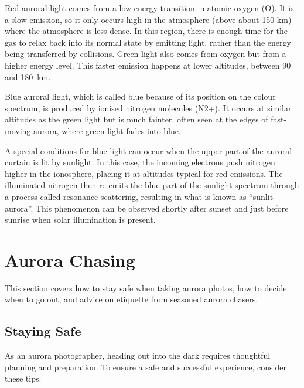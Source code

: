 \documentclass{article}
\newcommand{\contributed}[1]{%
    \par\noindent
    \begingroup
    \setlength{\leftskip}{1em}%
    \itshape
    Contributors: #1
    \par
    \endgroup
    \vspace{0.5em}
}
\begin{document}
Red auroral light comes from a low-energy transition in atomic oxygen (O). It is a slow emission, so it only occurs high in the atmosphere (above about 150 km) where the atmosphere is less dense. In this region, there is enough time for the gas to relax back into its normal state by emitting light, rather than the energy being transferred by collisions. Green light also comes from oxygen but from a higher energy level. This faster emission happens at lower altitudes, between 90 and 180~km.


Blue auroral light, which is called blue because of its position on the colour spectrum, is produced by ionised nitrogen molecules (N2+). It occurs at similar altitudes as the green light but is much fainter, often seen at the edges of fast-moving aurora, where green light fades into blue. 


A special conditions for blue light can occur when the upper part of the auroral curtain is lit by sunlight. In this case, the incoming electrons push nitrogen higher in the ionosphere, placing it at altitudes typical for red emissions. The illuminated nitrogen then re-emits the blue part of the sunlight spectrum through a process called resonance scattering, resulting in what is known as ``sunlit aurora''. This phenomenon can be observed shortly after sunset and just before sunrise when solar illumination is present.


\section{Aurora Chasing}
This section covers how to stay safe when taking aurora photos, how to decide when to go out, and advice on etiquette from seasoned aurora chasers.

\subsection{Staying Safe}

As an aurora photographer, heading out into the dark requires thoughtful planning and preparation. To ensure a safe and successful experience, consider these tips.
\end{document}
